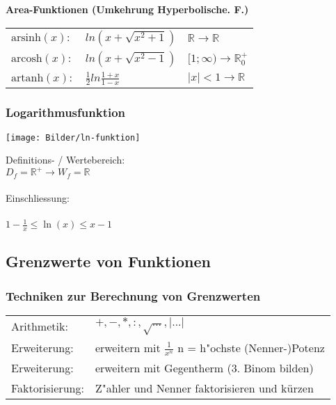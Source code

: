     \textbf{Area-Funktionen (Umkehrung Hyperbolische. F.)} \\
        \begin{tabular}{lll}
            $\mathrm{arsinh}(x): $ & $ln(x + \sqrt{x^2+1})$         & $\mathbb{R} \rightarrow \mathbb{R}$ \\
            $\mathrm{arcosh}(x): $ & $ln(x + \sqrt{x^2-1})$         & $[1; \infty) \rightarrow \mathbb{R}^+_0$  \\
            $\mathrm{artanh}(x): $ & $\frac{1}{2}ln\frac{1+x}{1-x}$ & $ \vert x \vert < 1 \rightarrow \mathbb{R} $ \\			
        \end{tabular}
    
\subsubsection{Logarithmusfunktion}
        
    \begin{minipage}{.45\linewidth}
        \texttt{[image: Bilder/ln-funktion]}
    \end{minipage}
        \hfill
    \begin{minipage}{.5\linewidth}
        Definitions- / Wertebereich: \\
        $D_f = \mathbb{R^+} \rightarrow W_f = \mathbb{R}$ \\
        \\
        Einschliessung: \\
        \\
        $1-\frac{1}{x} \leq \ln(x) \leq x-1$
    \end{minipage}
        
\subsection{Grenzwerte von Funktionen}
    
\subsubsection{Techniken zur Berechnung von Grenzwerten}	
    \begin{tabular}{ll}
        Arithmetik: & $+, -, *, :, \sqrt{...}, \vert ...\vert$ \\
        Erweiterung:& erweitern mit $\frac{1}{x^n}$ n = h"ochste (Nenner-)Potenz \\
        Erweiterung: & erweitern mit Gegentherm (3. Binom bilden)\\
        Faktorisierung: & Z"ahler und Nenner faktorisieren und kürzen \\
    \end{tabular}
    

